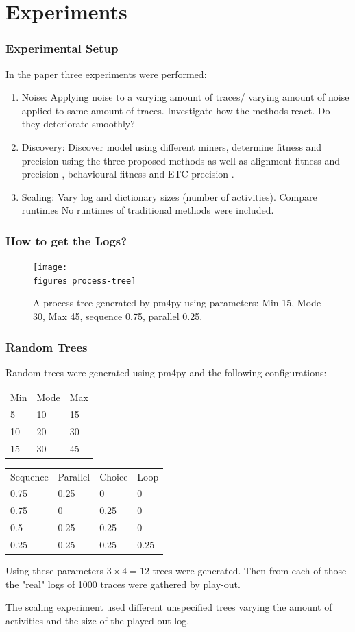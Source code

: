 \documentclass{beamer}
\newcommand{\figures}{../figures/}
\begin{document}
	\section{Experiments}
	\begin{frame}
		\frametitle{Experimental Setup}
		In the paper three experiments were performed:
		\begin{enumerate}
			\item Noise: Applying noise to a varying amount of traces/ varying amount of noise applied to same amount of traces. Investigate how the methods react. Do they deteriorate smoothly?
			\item Discovery: Discover model using different miners, determine fitness and precision using the three proposed methods as well as alignment fitness and precision \cite{Aals16}, behavioural fitness \cite{GMVB09} and ETC precision \cite{MuCa10}.
			\item Scaling: Vary log and dictionary sizes (number of activities). Compare runtimes \alert{No runtimes of traditional methods were included.}
		\end{enumerate}

	\end{frame}
\begin{frame}
	\frametitle{How to get the Logs?}
	\begin{figure}
		\texttt{[image: \\figures process-tree]}
		\caption{A process tree generated by pm4py using parameters: Min 15, Mode 30, Max 45, sequence 0.75, parallel 0.25. }
		\label{fig:process-tree}
	\end{figure}
\end{frame}
	\begin{frame}
		\frametitle{Random Trees}
		Random trees were generated using pm4py and the following configurations:
		
		\begin{center}
		\begin{tabular}{lll}
			Min & Mode & Max \\
			5 & 10 & 15 \\
			10 & 20 & 30 \\
			15 & 30 & 45 \\
		\end{tabular}
	\hspace{40pt}
		\begin{tabular}{llll}
			Sequence & Parallel & Choice & Loop \\
			0.75 & 0.25 & 0 & 0 \\
			0.75 & 0 & 0.25 & 0 \\
			0.5 & 0.25 & 0.25 & 0 \\
			0.25 & 0.25 & 0.25 & 0.25 \\
		\end{tabular}
	\end{center}

		Using these parameters $3\times4=12$ trees were generated.
		Then from each of those the "real" logs of 1000 traces were gathered by play-out.
		
		The scaling experiment used different unspecified trees varying the amount of activities and the size of the played-out log.
	\end{frame}
	
\end{document}
